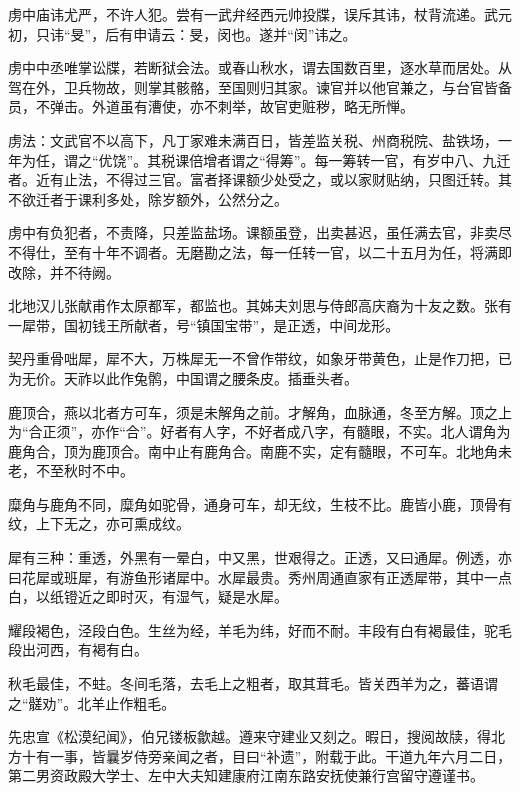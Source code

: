 \documentclass[]{article}
\begin{document}
虏中庙讳尤严，不许人犯。尝有一武弁经西元帅投牒，误斥其讳，杖背流递。武元初，只讳``旻''，后有申请云：旻，闵也。遂并``闵''讳之。

虏中中丞唯掌讼牒，若断狱会法。或春山秋水，谓去国数百里，逐水草而居处。从驾在外，卫兵物故，则掌其骸骼，至国则归其家。谏官并以他官兼之，与台官皆备员，不弹击。外道虽有漕使，亦不刺举，故官吏赃秽，略无所惮。

虏法：文武官不以高下，凡丁家难未满百日，皆差监关税、州商税院、盐铁场，一年为任，谓之``优饶''。其税课倍增者谓之``得筹''。每一筹转一官，有岁中八、九迁者。近有止法，不得过三官。富者择课额少处受之，或以家财贴纳，只图迁转。其不欲迁者于课利多处，除岁额外，公然分之。

虏中有负犯者，不责降，只差监盐场。课额虽登，出卖甚迟，虽任满去官，非卖尽不得仕，至有十年不调者。无磨勘之法，每一任转一官，以二十五月为任，将满即改除，并不待阙。

北地汉儿张献甫作太原都军，都监也。其姊夫刘思与侍郎高庆裔为十友之数。张有一犀带，国初钱王所献者，号``镇国宝带''，是正透，中间龙形。

契丹重骨咄犀，犀不大，万株犀无一不曾作带纹，如象牙带黄色，止是作刀把，已为无价。天祚以此作兔鹘，中国谓之腰条皮。插垂头者。

鹿顶合，燕以北者方可车，须是未解角之前。才解角，血脉通，冬至方解。顶之上为``合正须''，亦作``合''。好者有人字，不好者成八字，有髓眼，不实。北人谓角为鹿角合，顶为鹿顶合。南中止有鹿角合。南鹿不实，定有髓眼，不可车。北地角未老，不至秋时不中。

糜角与鹿角不同，糜角如驼骨，通身可车，却无纹，生枝不比。鹿皆小鹿，顶骨有纹，上下无之，亦可熏成纹。

犀有三种：重透，外黑有一晕白，中又黑，世艰得之。正透，又曰通犀。例透，亦曰花犀或班犀，有游鱼形诸犀中。水犀最贵。秀州周通直家有正透犀带，其中一点白，以纸镫近之即时灭，有湿气，疑是水犀。

耀段褐色，泾段白色。生丝为经，羊毛为纬，好而不耐。丰段有白有褐最佳，驼毛段出河西，有褐有白。

秋毛最佳，不蛀。冬间毛落，去毛上之粗者，取其茸毛。皆关西羊为之，蕃语谓之``髊劝''。北羊止作粗毛。

先忠宣《松漠纪闻》，伯兄镂板歙越。遵来守建业又刻之。暇日，搜阅故牍，得北方十有一事，皆曩岁侍旁亲闻之者，目曰``补遗''，附载于此。干道九年六月二日，第二男资政殿大学士、左中大夫知建康府江南东路安抚使兼行宫留守遵谨书。
\end{document}
